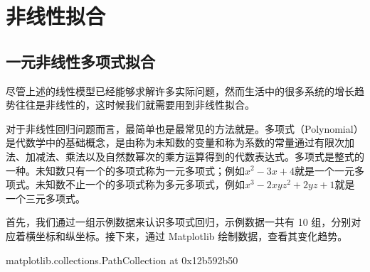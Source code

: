 \documentclass[letterpaper,10pt,english]{sphinxmanual}
\begin{document}
\section{非线性拟合}
\label{\detokenize{docs/prediction_model:id7}}

\subsection{一元非线性多项式拟合}
\label{\detokenize{docs/prediction_model:id8}}
尽管上述的线性模型已经能够求解许多实际问题，然而生活中的很多系统的增长趋势往往是非线性的，这时候我们就需要用到非线性拟合。

对于非线性回归问题而言，最简单也是最常见的方法就是。多项式（Polynomial）是代数学中的基础概念，是由称为未知数的变量和称为系数的常量通过有限次加法、加减法、乘法以及自然数幂次的乘方运算得到的代数表达式。多项式是整式的一种。未知数只有一个的多项式称为一元多项式；例如\(x^{2}-3 x+4\)就是一个一元多项式。未知数不止一个的多项式称为多元多项式，例如\(x^{3}-2 x y z^{2}+2 y z+1\)就是一个三元多项式。

首先，我们通过一组示例数据来认识多项式回归，示例数据一共有 10 组，分别对应着横坐标和纵坐标。接下来，通过 Matplotlib 绘制数据，查看其变化趋势。

\begin{sphinxVerbatim}[commandchars=\\\{\}]
  \PYG{p}{[}         \PYG{p}{]} 
  \PYG{p}{[}         \PYG{p}{]}  
   
\end{sphinxVerbatim}

\begin{sphinxVerbatim}[commandchars=\\\{\}]
\PYGZlt{}matplotlib.collections.PathCollection at 0x12b592b50\PYGZgt{}
\end{sphinxVerbatim}
\end{document}
